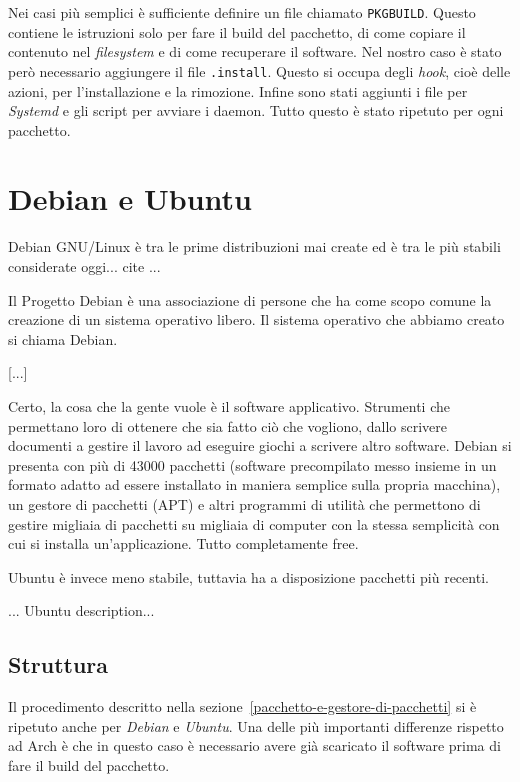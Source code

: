 \documentclass[10pt,titlepage,twoside,a4paper]{report}
\begin{document}
Nei casi più semplici è sufficiente definire un file chiamato 
\texttt{PKGBUILD}. Questo contiene le istruzioni solo per fare il build del 
pacchetto, di come copiare il contenuto nel \emph{filesystem} e di come 
recuperare il software. Nel nostro caso è stato però necessario aggiungere
il file \texttt{.install}. Questo si occupa degli \emph{hook}, cioè delle 
azioni, per l'installazione e la rimozione. Infine sono stati aggiunti i file 
per \emph{Systemd} e gli script per avviare i daemon. Tutto questo è stato 
ripetuto per ogni pacchetto.


\section{Debian e Ubuntu}
Debian GNU/Linux è tra le prime distribuzioni mai 
create\cite{debianFirstDistro} ed 
è tra le più stabili considerate oggi... cite ...
 
\cite{debian}
\begin{displayquote}
Il Progetto Debian è una associazione di persone che ha come scopo comune la 
creazione di un sistema operativo libero. Il sistema operativo che abbiamo 
creato si chiama Debian.

[...]

Certo, la cosa che la gente vuole è il software applicativo. Strumenti che 
permettano loro di ottenere che sia fatto ciò che vogliono, dallo scrivere 
documenti a gestire il lavoro ad eseguire giochi a scrivere altro software. 
Debian si presenta con più di 43000 pacchetti (software precompilato messo 
insieme in un formato adatto ad essere installato in maniera semplice sulla 
propria macchina), un gestore di pacchetti (APT) e altri programmi di utilità 
che permettono di gestire migliaia di pacchetti su migliaia di computer con la 
stessa semplicità con cui si installa un'applicazione. Tutto completamente 
free. 
\end{displayquote}

Ubuntu è invece meno stabile, tuttavia ha a
disposizione pacchetti più recenti.

... Ubuntu description...

\subsection{Struttura}
Il procedimento descritto nella sezione~\ref{pacchetto-e-gestore-di-pacchetti}
si è ripetuto anche per \emph{Debian} e \emph{Ubuntu}. Una delle più 
importanti differenze rispetto ad Arch è che in questo caso è necessario 
avere già scaricato il software prima di fare il build del pacchetto.
\end{document}
